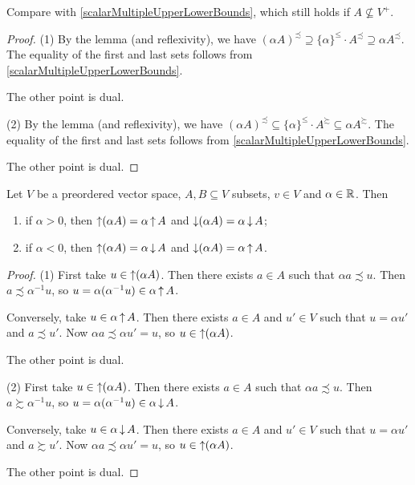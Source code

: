 Compare with \ref{scalarMultipleUpperLowerBounds}, which still holds if $A \nsubseteq V^+$.
\begin{proof}
(1) By the lemma (and reflexivity), we have $(\alpha A)^\precsim \supseteq \{\alpha\}^\leq\cdot A^\precsim \supseteq \alpha A^\precsim$. The equality of the first and last sets follows from \ref{scalarMultipleUpperLowerBounds}.

The other point is dual.

(2) By the lemma (and reflexivity), we have $(\alpha A)^\precsim \subseteq \{\alpha\}^\leq\cdot A^\succsim \subseteq \alpha A^\succsim$. The equality of the first and last sets follows from \ref{scalarMultipleUpperLowerBounds}.

The other point is dual.
\end{proof}

\begin{lemma} \label{scalarMultipleUpDownSets}
Let $V$ be a preordered vector space, $A, B\subseteq V$ subsets, $v\in V$ and $\alpha\in \mathbb{R}$. Then
\begin{enumerate}
\item if $\alpha > 0$, then $\operatorname{\uparrow} (\alpha A) = \alpha \operatorname{\uparrow} A$ and $\operatorname{\downarrow}(\alpha A) = \alpha \operatorname{\downarrow} A$;
\item if $\alpha < 0$, then $\operatorname{\uparrow}(\alpha A) = \alpha \operatorname{\downarrow} A$ and $\operatorname{\downarrow}(\alpha A) = \alpha \operatorname{\uparrow} A$.
\end{enumerate}
\end{lemma}
\begin{proof}
(1) First take $u\in \operatorname{\uparrow} (\alpha A)$. Then there exists $a\in A$ such that $\alpha a \precsim u$. Then $a\precsim \alpha^{-1}u$, so $u = \alpha (\alpha^{-1}u) \in \alpha \operatorname{\uparrow} A$.

Conversely, take $u\in \alpha \operatorname{\uparrow} A$. Then there exists $a\in A$ and $u'\in V$ such that $u = \alpha u'$ and $a\precsim u'$. Now $\alpha a \precsim \alpha u' = u$, so $u \in \operatorname{\uparrow} (\alpha A)$.

The other point is dual.

(2) First take $u\in \operatorname{\uparrow} (\alpha A)$. Then there exists $a\in A$ such that $\alpha a \precsim u$. Then $a\succsim \alpha^{-1}u$, so $u = \alpha (\alpha^{-1}u) \in \alpha \operatorname{\downarrow} A$.

Conversely, take $u\in \alpha \operatorname{\downarrow} A$. Then there exists $a\in A$ and $u'\in V$ such that $u = \alpha u'$ and $a\succsim u'$. Now $\alpha a \precsim \alpha u' = u$, so $u \in \operatorname{\uparrow} (\alpha A)$.

The other point is dual.
\end{proof}

